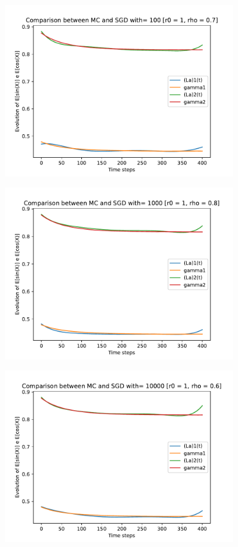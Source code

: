 \documentclass[a4paper,11pt,openright]{report}
\begin{document}
\begin{figure}[H]
\centering
\includegraphics[width=0.9\textwidth]{images/graphs T = 4/n = 6, M = 100 sine and cosine.pdf}
\end{figure}
\begin{figure}[H]
\centering
\includegraphics[width=0.9\textwidth]{images/graphs T = 4/n = 6, M = 1000 sine and cosine.pdf}
\end{figure}
\begin{figure}[H]
\centering
\includegraphics[width=0.9\textwidth]{images/graphs T = 4/n = 6, M = 10000 sine and cosine.pdf}
\end{figure}
\newpage
\end{document}
